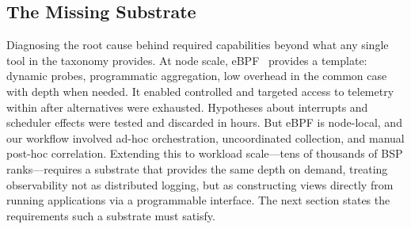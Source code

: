 \subsection{The Missing Substrate}

Diagnosing the root cause behind  required capabilities beyond what any
single tool in the taxonomy provides.
At node scale, eBPF~\cite{:eBPF} provides a template: dynamic probes, programmatic aggregation, low
overhead in the common case with depth when needed.
It enabled controlled and targeted access to telemetry within \mpiw{} after alternatives were
exhausted.
Hypotheses about interrupts and scheduler effects were tested and discarded in hours.
But eBPF is node-local, and our workflow involved ad-hoc orchestration, uncoordinated collection,
and manual post-hoc correlation.
Extending this to workload scale---tens of thousands of BSP ranks---requires a substrate that
provides the same depth on demand, treating observability not as distributed logging, but as
constructing views directly from running applications via a programmable interface.
The next section states the requirements such a substrate must satisfy.
